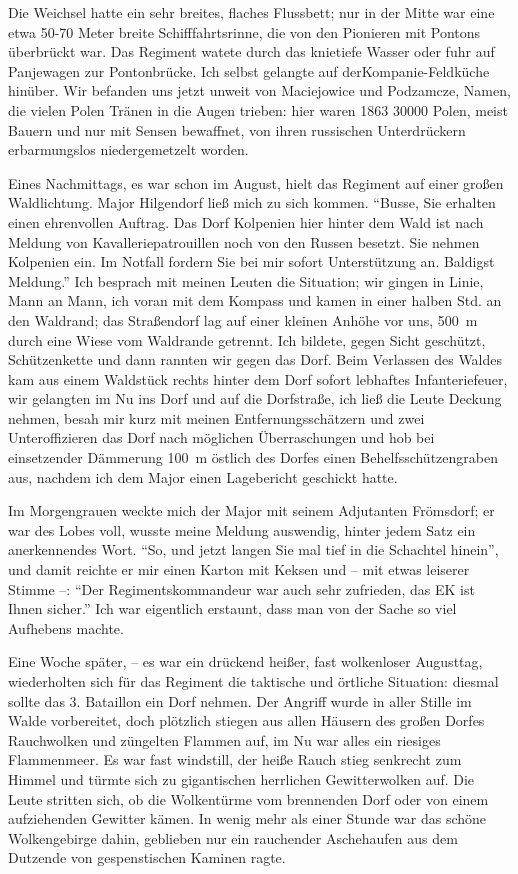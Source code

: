 \documentclass[a5paper,pagesize,10pt,twoside=true]{scrbook}
\begin{document}
Die Weichsel hatte ein sehr breites, flaches Flussbett; nur in der Mitte war eine etwa 50-70 Meter breite Schifffahrtsrinne, die von den Pionieren mit Pontons überbrückt war. Das Regiment watete durch das knietiefe Wasser oder fuhr auf Panjewagen zur Pontonbrücke. Ich selbst gelangte auf der\linebreak Kompanie-Feldküche hinüber. Wir befanden uns jetzt unweit von Maciejowice und Podzamcze, Namen, die vielen Polen Tränen in die Augen trieben: hier waren 1863 \num{30000} Polen, meist Bauern und nur mit Sensen bewaffnet, von ihren russischen Unterdrückern erbarmungslos niedergemetzelt worden.

Eines Nachmittags, es war schon im August, hielt das Regiment auf einer großen Waldlichtung. Major Hilgendorf ließ mich zu sich kommen. \enquote{Busse, Sie erhalten einen ehrenvollen Auftrag. Das Dorf Kolpenien hier hinter dem Wald ist nach Meldung von Kavalleriepatrouillen noch von den Russen besetzt. Sie nehmen Kolpenien ein. Im Notfall fordern Sie bei mir sofort Unterstützung an. Baldigst Meldung.} Ich besprach mit meinen Leuten die Situation; wir gingen in Linie, Mann an Mann, ich voran mit dem Kompass und kamen in einer halben Std. an den Waldrand; das Straßendorf lag auf einer kleinen Anhöhe vor uns, 500~m durch eine Wiese vom Waldrande getrennt. Ich bildete, gegen Sicht geschützt, Schützenkette und dann rannten wir gegen das Dorf. Beim Verlassen des Waldes kam aus einem Waldstück rechts hinter dem Dorf sofort lebhaftes Infanteriefeuer, wir gelangten im Nu ins Dorf und auf die Dorfstraße, ich ließ die Leute Deckung nehmen, besah mir kurz mit meinen Entfernungsschätzern und zwei Unteroffizieren das Dorf nach möglichen Überraschungen und hob bei einsetzender Dämmerung 100~m östlich des Dorfes einen Behelfsschützengraben aus, nachdem ich dem Major einen Lagebericht geschickt hatte.

Im Morgengrauen weckte mich der Major mit seinem Adjutanten Frömsdorf; er war des Lobes voll, wusste meine Meldung auswendig, hinter jedem Satz ein anerkennendes Wort. \enquote{So, und jetzt langen Sie mal tief in die Schachtel hinein}, und damit reichte er mir einen Karton mit Keksen und -- mit etwas leiserer Stimme --: \enquote{Der Regimentskommandeur war auch sehr zufrieden, das EK ist Ihnen sicher.} Ich war eigentlich erstaunt, dass man von der Sache so viel Aufhebens machte.

Eine Woche später, -- es war ein drückend heißer, fast wolkenloser Augusttag, wiederholten sich für das Regiment die taktische und örtliche Situation: diesmal sollte das 3. Bataillon ein Dorf nehmen. Der Angriff wurde in aller Stille im Walde vorbereitet, doch plötzlich stiegen aus allen Häusern des großen Dorfes Rauchwolken und züngelten Flammen auf, im Nu war alles ein riesiges Flammenmeer. Es war fast windstill, der heiße Rauch stieg senkrecht zum Himmel und türmte sich zu gigantischen herrlichen Gewitterwolken auf. Die Leute stritten sich, ob die Wolkentürme vom brennenden Dorf oder von einem aufziehenden Gewitter kämen. In wenig mehr als einer Stunde war das schöne Wolkengebirge dahin, geblieben nur ein rauchender Aschehaufen aus dem Dutzende von gespenstischen Kaminen ragte.
\end{document}
